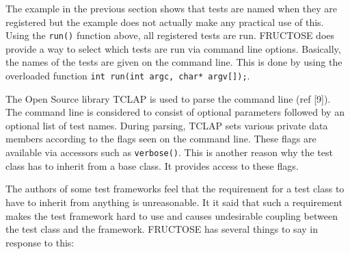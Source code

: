 \documentclass{book}
\begin{document}

The example in the previous section shows that tests are named when they are
registered but the example does not actually make any practical use of this.
Using the {\tt run()} function above, all registered tests are run. FRUCTOSE
does provide a way to select which tests are run via command line options.
Basically, the names of the tests are given on the command line. This is done
by using the overloaded function {\tt int run(int argc, char* argv[]);}.

The Open Source library TCLAP is used to parse the command line (ref [9]).
The command line is considered to consist of optional parameters
followed by an optional list of test names.
During parsing, TCLAP sets various private data members according to the
flags seen on the command line. These flags are available via accessors
such as {\tt verbose()}. This is another reason why the test class has
to inherit from a base class. It provides access to these flags.


The authors of some test frameworks feel that the requirement
for a test class to have to inherit from anything is unreasonable.
It it said that such a requirement makes the test framework hard to use
and causes undesirable coupling between the test class and the framework.
FRUCTOSE has several things to say in response to this:
\end{document}
